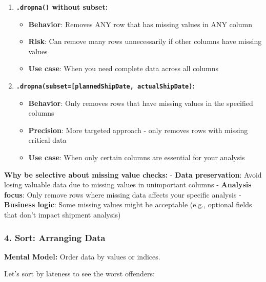 \documentclass[
  letterpaper,
  DIV=11,
  numbers=noendperiod]{scrartcl}
\providecommand{\tightlist}{%
  \setlength{\itemsep}{0pt}\setlength{\parskip}{0pt}}
\begin{document}
\begin{enumerate}
\def\labelenumi{\arabic{enumi}.}
\tightlist
\item
  \textbf{\texttt{.dropna()} without subset:}

  \begin{itemize}
  \tightlist
  \item
    \textbf{Behavior}: Removes ANY row that has missing values in ANY
    column
  \item
    \textbf{Risk}: Can remove many rows unnecessarily if other columns
    have missing values
  \item
    \textbf{Use case}: When you need complete data across all columns
  \end{itemize}
\item
  \textbf{\texttt{.dropna(subset={[}\textquotesingle{}plannedShipDate\textquotesingle{},\ \textquotesingle{}actualShipDate\textquotesingle{}{]})}:}

  \begin{itemize}
  \tightlist
  \item
    \textbf{Behavior}: Only removes rows that have missing values in the
    specified columns
  \item
    \textbf{Precision}: More targeted approach - only removes rows with
    missing critical data
  \item
    \textbf{Use case}: When only certain columns are essential for your
    analysis
  \end{itemize}
\end{enumerate}

\textbf{Why be selective about missing value checks:} - \textbf{Data
preservation}: Avoid losing valuable data due to missing values in
unimportant columns - \textbf{Analysis focus}: Only remove rows where
missing data affects your specific analysis - \textbf{Business logic}:
Some missing values might be acceptable (e.g., optional fields that
don't impact shipment analysis)

\subsubsection{4. Sort: Arranging Data}\label{sort-arranging-data}

\textbf{Mental Model:} Order data by values or indices.

Let's sort by lateness to see the worst offenders:
\end{document}
